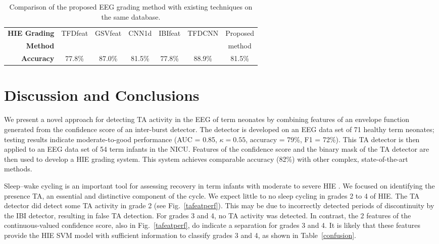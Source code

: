 \documentclass[conference]{IEEEtran}
\begin{document}
\begin{table}[h]
\renewcommand{\arraystretch}{1.5}
\centering
\caption{Comparison of the proposed EEG grading method with existing techniques on the same database.}
\label{compare}
\setlength\tabcolsep{3.0pt}
\begin{tabular}{r | c c c c c c}
\toprule
\textbf{HIE Grading} & TFDfeat & GSVfeat & CNN1d & IBIfeat & TFDCNN & Proposed \\
\textbf{Method} & \cite{R11} & \cite{R12} & \cite{raurale2020cnn} & \cite{R13} & \cite{jne} & method \\
\midrule
\textbf{Accuracy} & 77.8\% & 87.0\% & 81.5\% & 77.8\% & 88.9\% & 81.5\%\\ 
\bottomrule
\end{tabular}
\end{table}



\section{Discussion and Conclusions}
\label{discussion}

We present a novel approach for detecting TA activity in the EEG of term neonates by combining features of an envelope function generated from the confidence score of an inter-burst detector. The detector is developed on an EEG data set of 71 healthy term neonates; testing results indicate moderate-to-good performance (AUC = 0.85, $\kappa=0.55$, accuracy = 79\%, F1 = 72\%). 
This TA detector is then applied to an EEG data set of 54 term infants in the NICU.
Features of the confidence score and the binary mask of the TA detector are then used to develop a HIE grading system. This system achieves comparable accuracy (82\%) with other complex, state-of-the-art methods. 

Sleep--wake cycling is an important tool for assessing recovery in term infants with moderate to severe HIE \cite{murray}. We focused on identifying the presence TA, an essential and distinctive component of the cycle. 
We expect little to no sleep cycling in grades 2 to 4 of HIE. The TA detector did detect some TA activity in grade 2 (see Fig.~\ref{tafeatperf}). This may be due to incorrectly detected periods of discontinuity by the IBI detector, resulting in false TA detection. For grades 3 and 4, no TA activity was detected. In contrast, the 2 features of the continuous-valued confidence score, also in Fig.~\ref{tafeatperf}, do indicate a separation for grades 3 and 4. It is likely that these features provide the HIE SVM model with sufficient information to classify grades 3 and 4, as shown in Table~\ref{confusion}.  
\end{document}
